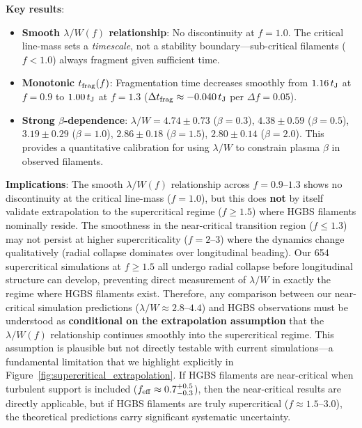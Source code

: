 \documentclass[twoside,twocolumn]{mnras}
\begin{document}
\textbf{Key results}:
\begin{itemize}
    \item \textbf{Smooth $\lambda/W(f)$ relationship}: No discontinuity at $f = 1.0$. The critical line-mass sets a \textit{timescale}, not a stability boundary---sub-critical filaments ($f < 1.0$) always fragment given sufficient time.
    \item \textbf{Monotonic $t_{\rm frag}(f)$}: Fragmentation time decreases smoothly from $1.16\,t_{\rm J}$ at $f = 0.9$ to $1.00\,t_{\rm J}$ at $f = 1.3$ ($\Delta t_{\rm frag} \approx -0.040\,t_{\rm J}$ per $\Delta f = 0.05$).
    \item \textbf{Strong $\beta$-dependence}: $\lambda/W = 4.74 \pm 0.73$ ($\beta = 0.3$), $4.38 \pm 0.59$ ($\beta = 0.5$), $3.19 \pm 0.29$ ($\beta = 1.0$), $2.86 \pm 0.18$ ($\beta = 1.5$), $2.80 \pm 0.14$ ($\beta = 2.0$). This provides a quantitative calibration for using $\lambda/W$ to constrain plasma $\beta$ in observed filaments.
\end{itemize}

\textbf{Implications}: The smooth $\lambda/W(f)$ relationship across $f = 0.9$--$1.3$ shows no discontinuity at the critical line-mass ($f = 1.0$), but this does \textbf{not} by itself validate extrapolation to the supercritical regime ($f \geq 1.5$) where HGBS filaments nominally reside. The smoothness in the near-critical transition region ($f \leq 1.3$) may not persist at higher supercriticality ($f = 2$--$3$) where the dynamics change qualitatively (radial collapse dominates over longitudinal beading). Our 654 supercritical simulations at $f \geq 1.5$ all undergo radial collapse before longitudinal structure can develop, preventing direct measurement of $\lambda/W$ in exactly the regime where HGBS filaments exist. Therefore, any comparison between our near-critical simulation predictions ($\lambda/W \approx 2.8$--$4.4$) and HGBS observations must be understood as \textbf{conditional on the extrapolation assumption} that the $\lambda/W(f)$ relationship continues smoothly into the supercritical regime. This assumption is plausible but not directly testable with current simulations---a fundamental limitation that we highlight explicitly in Figure~\ref{fig:supercritical_extrapolation}. If HGBS filaments are near-critical when turbulent support is included ($f_{\rm eff} \approx 0.7^{+0.5}_{-0.3}$), then the near-critical results are directly applicable, but if HGBS filaments are truly supercritical ($f \approx 1.5$--$3.0$), the theoretical predictions carry significant systematic uncertainty.
\end{document}
